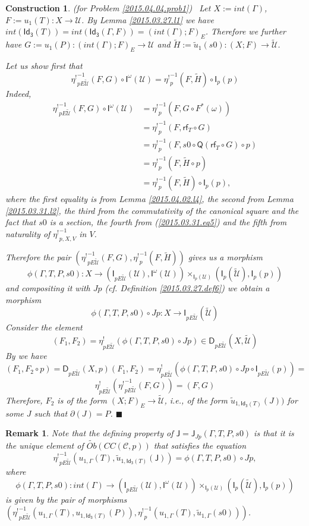 \documentclass[12pt]{article}
\numberwithin{equation}{section}
\newtheorem{remark}[proposition]{Remark}
\newtheorem{construction0}[proposition]{Construction}
\newenvironment{construction}[1]{\begin{construction0}(for Problem \ref{#1})\ }{$\blacksquare$ \end{construction0}}
\newcommand{\llabel}[1]{\label{#1}}
\newcommand{\sr}{\rightarrow}
\newcommand{\wt}{\widetilde}
\newcommand{\toCC}{CC} %
\newcommand{\C}{{\mathcal C}}  %
\newcommand{\Idx}{\mathsf{Id_3}} %
\newcommand{\J}{\mathsf{J}}
\newcommand{\U}{\mathcal{U}}
\newcommand{\D}{\mathsf{D}}
\newcommand{\I}{\mathsf{I}}
\newcommand{\rf}{\mathsf{rf}}
\newcommand{\Q}{\mathsf{Q}}
\newcommand{\etashriek}{\eta^!}
\newcommand{\etaunshriek}{{\etashriek}^{-1}}
\newcommand{\Obwt}{\wt{Ob}}
\begin{document}
\begin{construction}{2015.04.04.prob1}\rm
\llabel{2015.04.04.constr1} Let $X:=int(\Gamma)$, $F:=u_1(T):X\sr \U$. By Lemma
\ref{2015.03.27.l1} we have
$int(\Idx(T))=int(\Idx(\Gamma,F))=(int(\Gamma);F)_{E}$. Therefore we further
have $G:=u_1(P):(int(\Gamma);F)_{E}\sr \U$ and $\wt{H}:=\wt{u}_1(s0):(X;F)\sr
\wt{\U}$.

Let us show first that
%
$$\etaunshriek_{pE\wt{\U}}(F,G)\circ \I^{\omega}(\U)=\etaunshriek_p(F,\wt{H})\circ \I_p(p)$$
%
Indeed,
%
\begin{align*}
  \etaunshriek_{pE\wt{\U}}(F,G)\circ \I^{\omega}(\U)
    & = \etaunshriek_p(F,G\circ F^*(\omega)) \\
    & = \etaunshriek_p(F,\rf_T\circ G) \\
    & = \etaunshriek_p(F,s0\circ \Q(\rf_T\circ G)\circ p) \\
    & = \etaunshriek_p(F,\wt{H}\circ p) \\
    & = \etaunshriek_p(F,\wt{H})\circ \I_p(p),
\end{align*}
%
where the first equality is from Lemma \ref{2015.04.02.l4}, the second from
Lemma \ref{2015.03.31.l2}, the third from the commutativity of the canonical
square and the fact that $s0$ is a section, the fourth from
(\ref{2015.03.31.eq5}) and the fifth from naturality of $\etaunshriek_{p,X,V}$ in $V$.

Therefore the pair $(\etaunshriek_{pE\wt{\U}}(F,G),\etaunshriek_p(F,\wt{H}))$ gives us a
morphism
%
$$\phi(\Gamma,T,P,s0):X\sr (\I_{pE\wt{\U}}(\U), \I^{\omega}(\U)) \times_{\I_p(\U)}
(\I_p(\wt{\U}),\I_p(p))$$
%
and compositing it with $Jp$ (cf. Definition \ref{2015.03.27.def6}) we obtain a
morphism
%
$$\phi(\Gamma,T,P,s0)\circ Jp: X\sr \I_{pE\wt{\U}}(\wt{\U})$$
%
Consider the element
%
$$(F_1,F_2)=\etashriek_{pE\wt{\U}}(\phi(\Gamma,T,P,s0)\circ Jp)\in
\D_{pE\wt{\U}}(X,\wt{\U})$$
%
By \cite[Problem 3.8(1)]{fromunivwithPi} we have
%
$$(F_1,F_2\circ
p)=\D_{pE\wt{\U}}(X,p)(F_1,F_2)=\etashriek_{pE\wt{\U}}(\phi(\Gamma,T,P,s0)\circ
Jp\circ \I_{pE\wt{\U}}(p))=$$
%
$$\etashriek_{pE\wt{\U}}(\etaunshriek_{pE\wt{\U}}(F,G))=(F,G)$$
%
Therefore, $F_2$ is of the form $(X;F)_E\sr \wt{\U}$, i.e., of the form
$\wt{u}_{1,\Idx(T)}(J))$ for some $J$ such that $\partial(J)=P$.
\end{construction}
%
\begin{remark}\rm
\llabel{2015.05.08.rem1} Note that the defining property of
$\J=\J_{Jp}(\Gamma,T,P,s0)$ is that it is the unique element of
$\Obwt(\toCC({\C},p))$ that satisfies the equation
%
$$\etaunshriek_{pE\wt{\U}}(u_{1,\Gamma}(T),\wt{u}_{1,\Idx(T)}(\J))=\phi(\Gamma,T,P,s0)\circ
Jp,$$
%
where
%
$$\phi(\Gamma,T,P,s0):int(\Gamma)\sr
(\I_{pE\wt{\U}}(\U),\I^{\omega}(\U))\times_{\I_p(\U)}(\I_p(\wt{\U}),\I_p(p))$$
%
is given by the pair of morphisms $(\etaunshriek_{pE\wt{\U}}(u_{1,\Gamma}(T),
u_{1,\Idx(T)}(P)), \etaunshriek_p(u_{1,\Gamma}(T),\wt{u}_{1,\Gamma}(s0)))$.
\end{remark}
%
\end{document}
